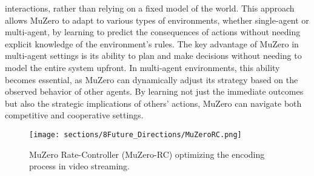 interactions, rather than relying on a fixed model of the world. This approach
allows MuZero to adapt to various types of environments, whether single-agent
or multi-agent, by learning to predict the consequences of actions without
needing explicit knowledge of the environment’s rules. The key advantage of
MuZero in multi-agent settings is its ability to plan and make decisions
without needing to model the entire system upfront. In multi-agent
environments, this ability becomes essential, as MuZero can dynamically adjust
its strategy based on the observed behavior of other agents. By learning not
just the immediate outcomes but also the strategic implications of others'
actions, MuZero can navigate both competitive and cooperative settings.
\begin{figure*}[t]
    \centering
    \texttt{[image: sections/8Future\_Directions/MuZeroRC.png]}
    \caption{MuZero Rate-Controller (MuZero-RC) optimizing the encoding process in video streaming.}
\end{figure*}